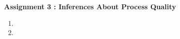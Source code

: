 \documentclass[a4 paper, 12pt]{report}
\begin{document}
\begin{center}
    \large \textbf{Assignment 3 : Inferences About Process Quality}
\end{center}
    

\begin{enumerate}
    
    \item 
    
    \item 
    
\end{enumerate}
\end{document}
